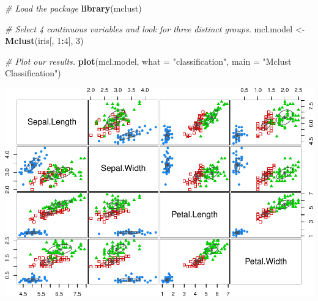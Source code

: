 \documentclass[12pt]{article}
\newenvironment{Shaded}{\begin{snugshade}}{\end{snugshade}}
\newcommand{\AttributeTok}[1]{\textcolor[rgb]{0.13,0.29,0.53}{#1}}
\newcommand{\CommentTok}[1]{\textcolor[rgb]{0.56,0.35,0.01}{\textit{#1}}}
\newcommand{\DecValTok}[1]{\textcolor[rgb]{0.00,0.00,0.81}{#1}}
\newcommand{\FunctionTok}[1]{\textcolor[rgb]{0.13,0.29,0.53}{\textbf{#1}}}
\newcommand{\NormalTok}[1]{#1}
\newcommand{\OtherTok}[1]{\textcolor[rgb]{0.56,0.35,0.01}{#1}}
\newcommand{\SpecialCharTok}[1]{\textcolor[rgb]{0.81,0.36,0.00}{\textbf{#1}}}
\newcommand{\StringTok}[1]{\textcolor[rgb]{0.31,0.60,0.02}{#1}}
\begin{document}
\begin{Shaded}
\begin{Highlighting}[]
\CommentTok{\# Load the package}
\FunctionTok{library}\NormalTok{(mclust)}

\CommentTok{\# Select 4 continuous variables and look for three distinct groups.}
\NormalTok{mcl.model }\OtherTok{\textless{}{-}} \FunctionTok{Mclust}\NormalTok{(iris[, }\DecValTok{1}\SpecialCharTok{:}\DecValTok{4}\NormalTok{], }\DecValTok{3}\NormalTok{)}

\CommentTok{\# Plot our results.}
\FunctionTok{plot}\NormalTok{(mcl.model, }\AttributeTok{what =} \StringTok{"classification"}\NormalTok{, }\AttributeTok{main =} \StringTok{"Mclust Classification"}\NormalTok{)}
\end{Highlighting}
\end{Shaded}

\includegraphics{exposition_files/figure-latex/unnamed-chunk-7-2.pdf}


\renewcommand\refname{Conclusion}

\end{document}
